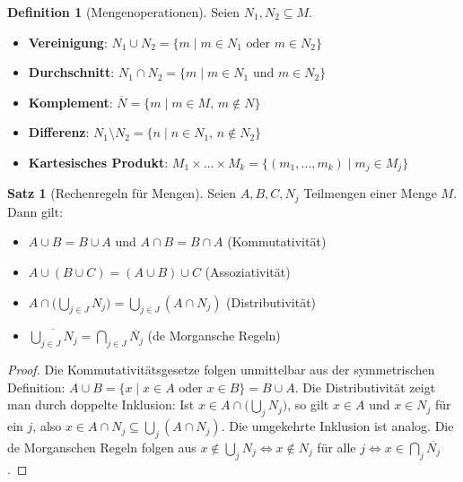 ﻿\documentclass[a4paper,12pt]{report}
\theoremstyle{definition}
\newtheorem{definition}{Definition}
\newtheorem{satz}{Satz}
\begin{document}
\begin{definition}[Mengenoperationen]
    Seien $N_1, N_2 \subseteq M$.
    \begin{itemize}
        \item[-] \textbf{Vereinigung}: $N_1 \cup N_2 = \{m \mid m \in N_1
              \text{ oder } m \in N_2\}$
        \item[-] \textbf{Durchschnitt}: $N_1 \cap N_2 = \{m \mid m \in N_1
              \text{ und } m \in N_2\}$
        \item[-] \textbf{Komplement}: $\overline{N} = \{m \mid m \in M,\, m \notin N\}$
        \item[-] \textbf{Differenz}: $N_1 \setminus N_2 = \{n \mid n \in N_1,\,
              n \notin N_2\}$
        \item[-] \textbf{Kartesisches Produkt}: $M_1 \times \dots \times M_k =
              \{(m_1,\dots,m_k) \mid m_j \in M_j\}$
    \end{itemize}
\end{definition}

\begin{satz}[Rechenregeln für Mengen]
    Seien $A, B, C, N_j$ Teilmengen einer Menge $M$. Dann gilt:
    \begin{itemize}
        \item[-] $A \cup B = B \cup A$ und $A \cap B = B \cap A$ \quad (Kommutativität)
        \item[-] $A \cup (B \cup C) = (A \cup B) \cup C$ \quad (Assoziativität)
        \item[-] $A \cap \bigl(\bigcup_{j \in J} N_j\bigr) = \bigcup_{j \in J}
              (A \cap N_j)$ \quad (Distributivität)
        \item[-] $\overline{\bigcup_{j \in J} N_j} = \bigcap_{j \in J} \overline{N_j}$
              \quad (de Morgansche Regeln)
    \end{itemize}
\end{satz}
\begin{proof}
    Die Kommutativitätsgesetze folgen unmittelbar aus der symmetrischen Definition:
    $A \cup B = \{x \mid x \in A \text{ oder } x \in B\} = B \cup A$.
    Die Distributivität zeigt man durch doppelte Inklusion:
    Ist $x \in A \cap \bigl(\bigcup_j N_j\bigr)$, so gilt $x \in A$ und $x \in N_j$
    für ein $j$, also $x \in A \cap N_j \subseteq \bigcup_j (A \cap N_j)$.
    Die umgekehrte Inklusion ist analog. Die de Morganschen Regeln folgen aus
    $x \notin \bigcup_j N_j \Leftrightarrow x \notin N_j$ für alle $j
    \Leftrightarrow x \in \bigcap_j \overline{N_j}$.
\end{proof}
\end{document}
